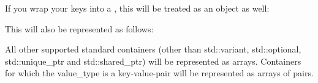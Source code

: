 \begin{DoxyCode}{0}

\end{DoxyCode}


If you wrap your keys into a {\ttfamily {}}, this will be treated as an object as well\+:


\begin{DoxyCode}{0}

\end{DoxyCode}


This will also be represented as follows\+:


\begin{DoxyCode}{0}

\end{DoxyCode}


All other supported standard containers (other than {\ttfamily std\+::variant}, {\ttfamily std\+::optional}, {\ttfamily std\+::unique\+\_\+ptr} and {\ttfamily std\+::shared\+\_\+ptr}) will be represented as arrays. Containers for which the {\ttfamily value\+\_\+type} is a key-\/value-\/pair will be represented as arrays of pairs. 